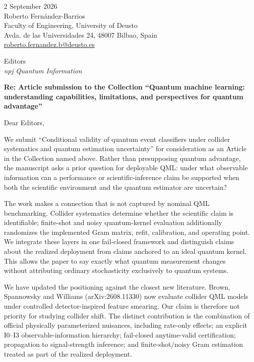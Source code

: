 \documentclass[10pt,a4paper]{article}
\begin{document}
\begin{flushright}
2 September 2026\\
Roberto Fern\'andez-Barrios\\
Faculty of Engineering, University of Deusto\\
Avda. de las Universidades 24, 48007 Bilbao, Spain\\
\href{mailto:roberto.fernandez.b@deusto.es}{roberto.fernandez.b@deusto.es}
\end{flushright}

Editors\\
\emph{npj Quantum Information}

\textbf{Re: Article submission to the Collection ``Quantum machine learning:
understanding capabilities, limitations, and perspectives for quantum
advantage''}

Dear Editors,

We submit ``Conditional validity of quantum event classifiers under collider
systematics and quantum estimation uncertainty'' for consideration as an
Article in the Collection named above. Rather than presupposing quantum
advantage, the manuscript asks a prior question for deployable QML: under what
observable information can a performance or scientific-inference claim be
supported when both the scientific environment and the quantum estimator are
uncertain?

The work makes a connection that is not captured by nominal QML benchmarking.
Collider systematics determine whether the scientific claim is identifiable;
finite-shot and noisy quantum-kernel evaluation additionally randomizes the
implemented Gram matrix, refit, calibration, and operating point. We integrate
these layers in one fail-closed framework and distinguish claims about the
realized deployment from claims anchored to an ideal quantum kernel. This
allows the paper to say exactly what quantum measurement changes without
attributing ordinary stochasticity exclusively to quantum systems.

We have updated the positioning against the closest new literature. Brown,
Spannowsky and Williams (arXiv:2608.11330) now evaluate collider QML models
under controlled detector-inspired feature smearing. Our claim is therefore
not priority for studying collider shift. The distinct contribution is the
combination of official physically parameterized nuisances, including
rate-only effects; an explicit I0--I3 observable-information hierarchy;
fail-closed anytime-valid certification; propagation to signal-strength
inference; and finite-shot/noisy Gram estimation treated as part of the
realized deployment.
\end{document}
